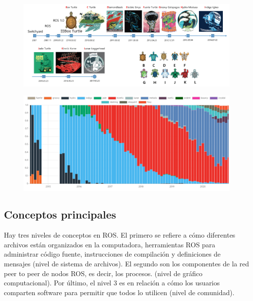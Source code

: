             \begin{figure}[htb]
            \centering
            \includegraphics[width=0.94\linewidth]{Main/Chapter3/Images3/ver_ros_1.png}
            \caption{}
            \label{f:Cap3-5_estadisticas_10}
            \end{figure} 
    
            \begin{figure}[htb]
            \centering
            \includegraphics[width=0.94\linewidth]{Main/Chapter3/Images3/ver_ros_2.png}
            \caption{}
            \label{f:Cap3-5_estadisticas_11}
            \end{figure} 
    
    \newpage
    
    \subsection{Conceptos principales}
            
            Hay tres niveles de conceptos en ROS. El primero se refiere a cómo diferentes archivos están organizados en la computadora, herramientas ROS para administrar código fuente, instrucciones de compilación y definiciones de mensajes (nivel de sistema de archivos). El segundo son los componentes de la red peer to peer de nodos ROS, es decir, los procesos. (nivel de gráfico computacional). Por último, el nivel 3 es en relación a cómo los usuarios comparten software para permitir que todos lo utilicen (nivel de comunidad).
            
